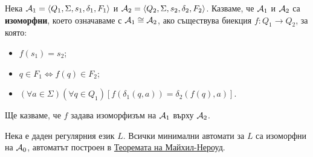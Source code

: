 \begin{dfn}
  Нека $\mathcal{A}_1 = \langle{Q_1,\Sigma,s_1,\delta_1,F_1}\rangle$ и $\mathcal{A}_2 = \langle{Q_2,\Sigma,s_2,\delta_2,F_2}\rangle$.
  Казваме, че $\mathcal{A}_1$ и $\mathcal{A}_2$ са {\bf изоморфни}, което означаваме с $\mathcal{A}_1 \cong \mathcal{A}_2$, ако
  съществува биекция $f: Q_1\to Q_2$, за която:
  \begin{itemize}
  \item
    $f(s_1) = s_2$;
  \item
    $q \in F_1 \iff f(q) \in F_2$;
  \item
    $(\forall a\in\Sigma)(\forall q\in Q_1)[f(\delta_1(q,a)) = \delta_2(f(q),a)]$.
  \end{itemize}
  Ще казваме, че $f$ задава изоморфизъм на $\mathcal{A}_1$ върху $\mathcal{A}_2$.
\end{dfn}

\begin{cor}
  Нека е даден регулярния език $L$.
  Всички минимални автомати за $L$ са изоморфни на $\mathcal{A}_0$, автоматът построен в \hyperref[th:myhill-nerode]{Теоремата на Майхил-Нероуд}.
\end{cor}
